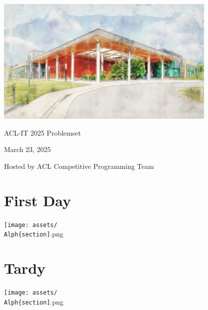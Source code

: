 \documentclass[12pt]{article}
\makeatletter
\newenvironment{problem}
{%
  \newcommand{\problemtitle}[1]{\def\@problemtitle{##1}}
  \newcommand{\problemdesc}[1]{\def\@problemdesc{##1}}
  \newcommand{\probleminput}[1]{\def\@probleminput{##1}}
  \newcommand{\problemoutput}[1]{\def\@problemoutput{##1}}
  \newcommand{\problemsamplein}[1]{\def\@problemsamplein{##1}}
  \newcommand{\problemsampleout}[1]{\def\@problemsampleout{##1}}
  \newcommand{\problemexplain}[1]{\def\@problemexplain{##1}}
  \def\@problemtitle{}
  \def\@problemdesc{}
  \def\@probleminput{}
  \def\@problemoutput{}
  \def\@problemsamplein{}
  \def\@problemsampleout{}
  \def\@problemexplain{}
}
{%
  \setlength\parindent{0pt}
  
  \section{\@problemtitle}

  {\hfill\texttt{[image: assets/\\Alph\{section]}.png}\hfill}
\makeatother
\begin{document}
\begin{titlepage}
  \setlength\parskip{0.2cm}
  \centering
  
  \includegraphics[width=0.8\textwidth]{./assets/acl.png}
  
  {\Huge ACL-IT 2025 Problemset}
  
  {\Large March 23, 2025}

  Hosted by ACL Competitive Programming Team
  
\end{titlepage}

\begin{problem}
  \problemtitle{First Day}
  \problemdesc{
    First day of school! Mr. Markley has everyone introduce themselves. Help
    Ralph introduce himself by saying ``Hello I’m Ralph!'' to others around him.
  }
  \probleminput{
    You will be given a single newline-terminated string. The length of the
    string will not exceed 100 characters (including the newline).
  }
  \problemoutput{
    Print out exactly ``Hello [\emph{input}] I'm Ralph!'', terminated by a newline.
  }
  \problemsamplein{%
    Dr. Priddy
    
    Ralph
  }
  \problemsampleout{%
    Hello Dr. Priddy I'm Ralph!

    Hello Ralph I'm Ralph!
  }
  \problemexplain{Explain the sample test cases here.}
\end{problem}

\begin{problem}
  \problemtitle{Tardy}
  \problemdesc{
    Uh oh! Ralph woke up late and is now late for class. Ralph doesn’t want to
    get detention. Ralph goes to detention if he is tardy more than the tardy limit
    for 2 or more quarters.

    Each quarter Ralph can be late no more than \(k\) times. Given that Ralph is
    late for school \(q_i\) times each quarter, help determine whether Ralph will go to
    detention.
  }
  \probleminput{
    You will be given \(k\) on the first line, and \(q_1\), \(q_2\), \(q_3\), \(q_4\) (\(1 <= q_1, q_2, q_3, q_4, k <= 45\)) on the second line.
  }
  \problemoutput{
    Print out either ``YES'' or ``NO'' based on whether Ralph is going to detention.
  }
  \problemsamplein{%
    5 \\
    2 2 6 5

    3 \\
    2 2 6 5
  }
  \problemsampleout{%
    NO

    YES
  }
  \problemexplain{Explain the sample test cases here.}
\end{problem}
\end{document}
